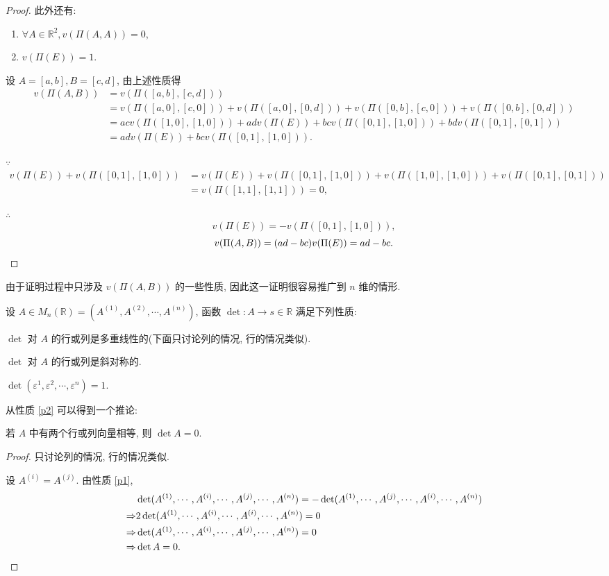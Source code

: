 \documentclass{ctexart}
\begin{document}
\begin{proof}
    此外还有:
    \begin{enumerate}
        \item $\forall A\in\mathbb{R}^2,v(\Pi(A,A))=0$,
        \item $v(\Pi(E))=1$.
    \end{enumerate}

    设 $A=[a,b],B=[c,d]$, 由上述性质得
    \begin{align*}
        v(\Pi(A,B)) & =v(\Pi([a,b],[c,d])) \\
        & =v(\Pi([a,0],[c,0]))+v(\Pi([a,0],[0,d]))+v(\Pi([0,b],[c,0]))+v(\Pi([0,b],[0,d])) \\
        & =acv(\Pi([1,0],[1,0]))+adv(\Pi(E))+bcv(\Pi([0,1],[1,0]))+bdv(\Pi([0,1],[0,1])) \\
        & =adv(\Pi(E))+bcv(\Pi([0,1],[1,0])).
    \end{align*}

    $\because$
    \begin{align*}
        v(\Pi(E))+v(\Pi([0,1],[1,0])) & =v(\Pi(E))+v(\Pi([0,1],[1,0]))+v(\Pi([1,0],[1,0]))+v(\Pi([0,1],[0,1])) \\
        & =v(\Pi([1,1],[1,1]))=0,
    \end{align*}

    $\therefore$
    \[v(\Pi(E))=-v(\Pi([0,1],[1,0])),\]
    \[v(\Pi(A,B))=(ad-bc)v(\Pi(E))=ad-bc.\qedhere\]
\end{proof}

由于证明过程中只涉及 $v(\Pi(A,B))$ 的一些性质, 因此这一证明很容易推广到 $n$ 维的情形.

设 $A\in M_n(\mathbb{R})=(A^{(1)},A^{(2)},\cdots,A^{(n)})$, 函数 $\det:A\to s\in\mathbb{R}$ 满足下列性质:
\begin{property}\label{p1}
    $\det$ 对 $A$ 的行或列是多重线性的(下面只讨论列的情况, 行的情况类似).
\end{property}
\begin{property}\label{p2}
    $\det$ 对 $A$ 的行或列是斜对称的.
\end{property}
\begin{property}\label{p3}
    $\det(\varepsilon^1,\varepsilon^2,\cdots,\varepsilon^n)=1$.
\end{property}
从性质 \ref{p2} 可以得到一个推论:
\begin{corollary}\label{c1}
    若 $A$ 中有两个行或列向量相等, 则 $\det A=0$.
\end{corollary}
\begin{proof}
    只讨论列的情况, 行的情况类似.

    设 $A^{(i)}=A^{(j)}$. 由性质 \ref{p1},
    \begin{align*}
        & \det(A^{(1)},\cdots,A^{(i)},\cdots,A^{(j)},\cdots,A^{(n)})=-\det(A^{(1)},\cdots,A^{(j)},\cdots,A^{(i)},\cdots,A^{(n)}) \\
        \Rightarrow & 2\det(A^{(1)},\cdots,A^{(i)},\cdots,A^{(i)},\cdots,A^{(n)})=0 \\
        \Rightarrow & \det(A^{(1)},\cdots,A^{(i)},\cdots,A^{(j)},\cdots,A^{(n)})=0 \\
        \Rightarrow & \det A=0.\qedhere
    \end{align*}
\end{proof}
\end{document}
